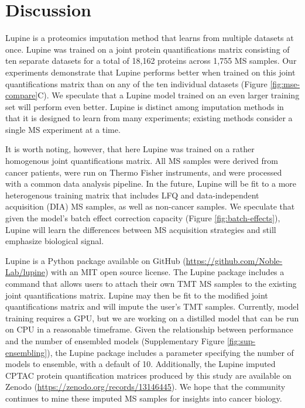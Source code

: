 \documentclass{article}
\begin{document}
\section{Discussion}

Lupine is a proteomics imputation method that learns from multiple datasets at once. Lupine was trained on a joint protein quantifications matrix consisting of ten separate datasets for a total of 18,162 proteins across 1,755 MS samples. Our experiments demonstrate that Lupine performs better when trained on this joint quantifications matrix than on any of the ten individual datasets (Figure \ref{fig:mse-compare}C). We speculate that a Lupine model trained on an even larger training set will perform even better. Lupine is distinct among imputation methods in that it is designed to learn from many experiments; existing methods consider a single MS experiment at a time.

It is worth noting, however, that here Lupine was trained on a rather homogenous joint quantifications matrix. All MS samples were derived from cancer patients, were run on Thermo Fisher instruments, and were processed with a common data analysis pipeline. In the future, Lupine will be fit to a more heterogenous training matrix that includes LFQ and data-independent acquisition (DIA) MS samples, as well as non-cancer samples. We speculate that given the model’s batch effect correction capacity (Figure \ref{fig:batch-effects}), Lupine will learn the differences between MS acquisition strategies and still emphasize biological signal. 


Lupine is a Python package available on GitHub (\url{https://github.com/Noble-Lab/lupine}) with an MIT open source license. The Lupine package includes a command that allows users to attach their own TMT MS samples to the existing joint quantifications matrix. Lupine may then be fit to the modified joint quantifications matrix and will impute the user’s TMT samples. Currently, model training requires a GPU, but we are working on a distilled model that can be run on CPU in a reasonable timeframe. Given the relationship between performance and the number of ensembled models (Supplementary Figure \ref{fig:sup-ensembling}), the Lupine package includes a parameter specifying the number of models to ensemble, with a default of 10. Additionally, the Lupine imputed CPTAC protein quantification matrices produced by this study are available on Zenodo (\url{https://zenodo.org/records/13146445}). We hope that the community continues to mine these imputed MS samples for insights into cancer biology. 
\end{document}
